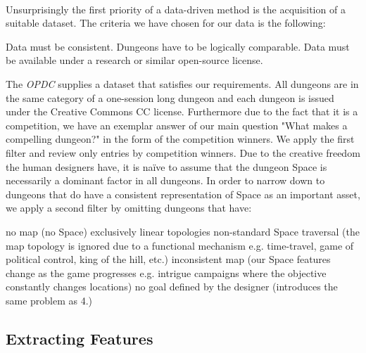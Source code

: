 \documentclass{UoYCSproject}
\begin{document}
\paragraph{}
Unsurprisingly the first priority of a data-driven method is the acquisition of a suitable dataset. The criteria we have chosen for our data is the following:
\begin{outline}[enumerate]
  \1 Data must be consistent. Dungeons have to be logically comparable.
  \1 Data must be available under a research or similar open-source license.
\end{outline}
The \textit{OPDC} supplies a dataset that satisfies our requirements. All dungeons are in the same category of a one-session long dungeon and each dungeon is issued under the Creative Commons CC license. Furthermore due to the fact that it is a competition, we have an exemplar answer of our main question "What makes a compelling dungeon?" in the form of the competition winners. We apply the first filter and review only entries by competition winners. Due to the creative freedom the human designers have, it is na\"{i}ve to assume that the dungeon Space is necessarily a dominant factor in all dungeons. In order to narrow down to dungeons that do have a consistent representation of Space as an important asset, we apply a second filter by omitting dungeons that have:
\begin{outline}[enumerate]
  \1 no map (no Space)
  \1 exclusively linear topologies
  \1 non-standard Space traversal (the map topology is ignored due to a functional mechanism e.g. time-travel, game of political control, king of the hill, etc.)
  \1 inconsistent map (our Space features change as the game progresses e.g. intrigue campaigns where the objective constantly changes locations)
  \1 no goal defined by the designer (introduces the same problem as 4.)
\end{outline}

\subsection{Extracting Features}
\label{subsec:feature_extraction}
\end{document}
